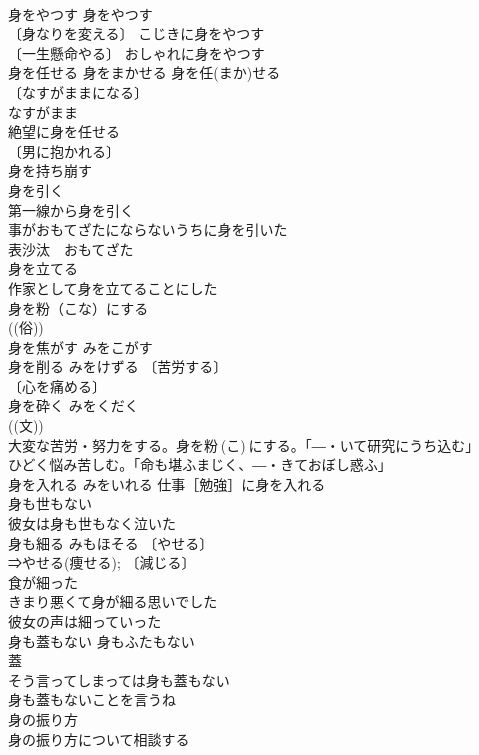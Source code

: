 \documentclass[8pt]{extreport}
\begin{document}
\begin{CJK}{UTF8}{min}
\\	身をやつす		身をやつす　
\\	〔身なりを変える〕 こじきに身をやつす 
\\	〔一生懸命やる〕 おしゃれに身をやつす 
\\	身を任せる	身をまかせる	身を任(まか)せる 
\\	〔なすがままになる〕
\\	なすがまま　
\\	絶望に身を任せる 
\\	〔男に抱かれる〕
\\	身を持ち崩す 
\\	身を引く		
\\	第一線から身を引く 
\\	事がおもてざたにならないうちに身を引いた 
\\	表沙汰　おもてざた 
\\	身を立てる		
\\	作家として身を立てることにした 
\\	身を粉（こな）にする		
\\	((俗)) 
\\	身を焦がす	みをこがす	
\\	身を削る	みをけずる	〔苦労する〕
\\	〔心を痛める〕
\\	身を砕く	みをくだく	
\\	((文)) 
\\	大変な苦労・努力をする。身を粉 (こ) にする。「―・いて研究にうち込む」 
\\	ひどく悩み苦しむ。「命も堪ふまじく、―・きておぼし惑ふ」
\\	身を入れる	みをいれる	仕事［勉強］に身を入れる 
\\	身も世もない		
\\	彼女は身も世もなく泣いた 
\\	身も細る	みもほそる	〔やせる〕
\\	⇒やせる(痩せる); 〔減じる〕
\\	食が細った 
\\	きまり悪くて身が細る思いでした 
\\	彼女の声は細っていった 
\\	身も蓋もない	身もふたもない	
\\	蓋　
\\	そう言ってしまっては身も蓋もない 
\\	身も蓋もないことを言うね 
\\	身の振り方		
\\	身の振り方について相談する 

\end{CJK}
\end{document}
